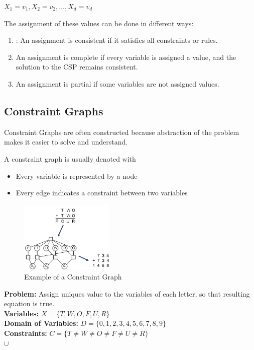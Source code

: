 \documentclass[
../../EiKI_Summary.tex,
]
{subfiles}
\begin{document}
\begin{csmb*}
    $X_1 = v_1, X_2 = v_2, \dots, X_d = v_d$
\end{csmb*}

The assignment of these values can be done in different ways:
\begin{enumerate}
    \item {}: An assignment is consistent if it satisfies all constraints or rules.
    \item {} An assignment is complete if every variable is assigned a value, and the solution to the CSP remains consistent.
    \item {} An assignment is partial if some variables are not assigned values.
\end{enumerate}

\subsection{Constraint Graphs}
Constraint Graphs are often constructed because abstraction of the problem makes it easier to solve and understand.

A constraint graph is usually denoted with
\begin{itemize}
    \item Every variable is represented by a node
    \item Every edge indicates a constraint between two variables
\end{itemize}

\begin{figure}
    [H]
    \centering
    \caption{Example of a Constraint Graph}
    \includegraphics[width=0.4\textwidth]{Pics/05/ConstraintGraphEx.png}
\end{figure}

\textbf{Problem:} Assign uniques value to the variables of each letter, so that resulting equation is true. \\

\textbf{Variables:} $X = \{T,W,O,F,U,R\}$\\
\textbf{Domain of Variables:} $D = \{0,1,2,3,4,5,6,7,8,9\}$\\
\textbf{Constraints:} $C = \{T \not = W \not= O \not= F \not= U \not= R\}$\\
$\cup$ 
\end{document}
